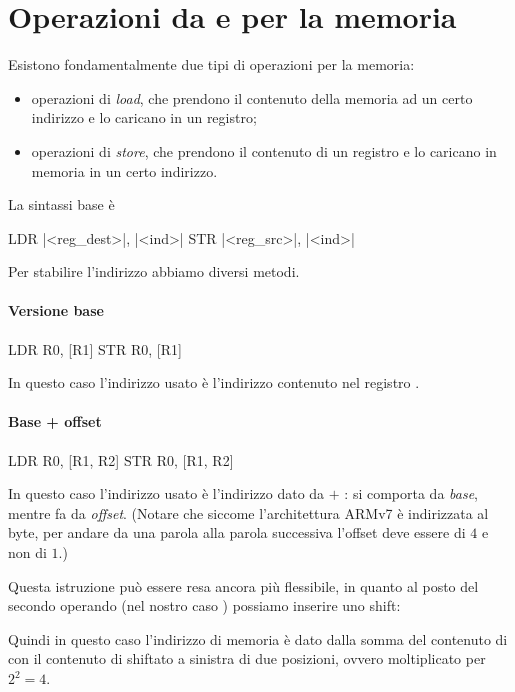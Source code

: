 \section{Operazioni da e per la memoria}

Esistono fondamentalmente due tipi di operazioni per la memoria:
\begin{itemize}
    \item operazioni di \emph{load}, che prendono il contenuto della memoria ad un certo indirizzo e lo caricano in un registro;
    \item operazioni di \emph{store}, che prendono il contenuto di un registro e lo caricano in memoria in un certo indirizzo.
\end{itemize}

La sintassi base è
\begin{ARMcode}
    LDR |<reg\_dest>|, |<ind>|
    STR |<reg\_src>|,  |<ind>|
\end{ARMcode}

Per stabilire l'indirizzo abbiamo diversi metodi.

\paragraph{Versione base}
\begin{ARMcode}
    LDR R0, [R1]
    STR R0, [R1]
\end{ARMcode}
In questo caso l'indirizzo usato è l'indirizzo contenuto nel registro .

\paragraph{Base + offset}
\begin{ARMcode}
    LDR R0, [R1, R2]
    STR R0, [R1, R2]
\end{ARMcode}
In questo caso l'indirizzo usato è l'indirizzo dato da  $+$ :  si comporta da \emph{base}, mentre  fa da \emph{offset}. (Notare che siccome l'architettura ARMv7 è indirizzata al byte, per andare da una parola alla parola successiva l'offset deve essere di $4$ e non di $1$.)

Questa istruzione può essere resa ancora più flessibile, in quanto al posto del secondo operando (nel nostro caso ) possiamo inserire uno shift:
Quindi in questo caso l'indirizzo di memoria è dato dalla somma del contenuto di  con il contenuto di  shiftato a sinistra di due posizioni, ovvero moltiplicato per $2^2 = 4$.

